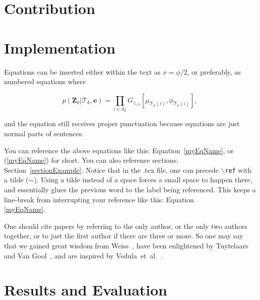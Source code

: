 \documentclass{ucl_thesis}
\def\etal{{et~al.}}
\begin{document}
\chapter{Contribution} %
\label{contribution}
%


\chapter{Implementation}
\label{chp:impl}
%





Equations can be inserted either within the text as $x=\phi/2$, or preferably, as
numbered equations where

\begin{equation} \label{myEqName}
 p(\mathbf{Z}_{k}|\mathcal{T}_{k},\mathbf{e}) = \prod_{i\in S_{k}}
G_{z_{i,k}}[\mu_{\mathcal{T}_{k}(i)},\phi_{\mathcal{T}_{k}(i)}],
\end{equation}

and the equation still receives proper punctuation because equations are just normal parts of sentences.

You can reference the above equations like this:  Equation~\ref{myEqName}, or (\ref{myEqName}) for short.  You can also reference sections:  Section~\ref{sectionExample}. Notice that in the .tex file, one can precede \texttt{$\backslash$ref} with a tilde ($\sim$). Using a tilde instead of a space forces a small space to happen there, and essentially glues the previous word to the label being referenced. This keeps a line-break from interrupting your reference like this: Equation\\ \ref{myEqName}. 

One should cite papers by referring to the only author, or the only two authors together, or to just the first author if there are three or more.  So one may say that we gained great wisdom from Weiss~\cite{WeissICCV01}, have been enlightened by Tuytelaars and Van Gool~\cite{TuytelaarsCVPR.2004:SynchVideo}, and are inspired by Vedula~\etal~\cite{Vedula:2005:ISM}.







\chapter{Results and Evaluation}
\label{chp:eval}
%
\end{document}

